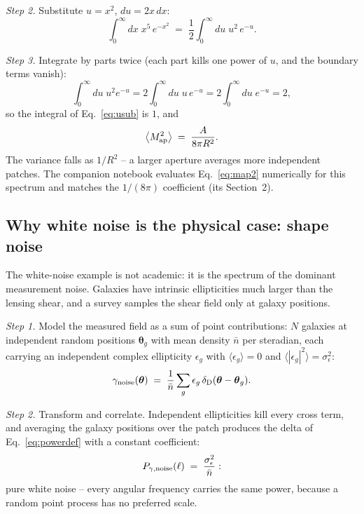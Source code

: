 \documentclass[11pt]{article}
\newcommand{\Map}{M_{\rm ap}}
\newcommand{\btheta}{\boldsymbol{\theta}}
\numberwithin{equation}{section}
\begin{document}
\emph{Step 2.}  Substitute $u = x^2$, $du = 2x\,dx$:
\begin{equation}
  \int_0^\infty dx\; x^5\, e^{-x^2}
  \;=\; \frac{1}{2}\int_0^\infty du\; u^2\, e^{-u} .
  \label{eq:usub}
\end{equation}

\emph{Step 3.}  Integrate by parts twice (each part kills one power
of $u$, and the boundary terms vanish):
\begin{equation}
  \int_0^\infty du\; u^2 e^{-u}
  = 2\int_0^\infty du\; u\, e^{-u}
  = 2\int_0^\infty du\; e^{-u}
  = 2 ,
  \label{eq:byparts}
\end{equation}
so the integral of Eq.~\eqref{eq:usub} is $1$, and
\begin{equation}
  \bigl\langle \Map^2 \bigr\rangle
  \;=\; \frac{A}{8\pi R^2} .
  \label{eq:map2white}
\end{equation}
The variance falls as $1/R^2$ -- a larger aperture averages more
independent patches.  The companion notebook evaluates
Eq.~\eqref{eq:map2} numerically for this spectrum and matches the
$1/(8\pi)$ coefficient (its Section~2).

\subsection{Why white noise is the physical case: shape noise}
\label{sec:shapenoise}

The white-noise example is not academic: it is the spectrum of the
dominant measurement noise.  Galaxies have intrinsic ellipticities
much larger than the lensing shear, and a survey samples the shear
field only at galaxy positions.

\emph{Step 1.}  Model the measured field as a sum of point
contributions: $N$ galaxies at independent random positions
$\btheta_g$ with mean density $\bar n$ per steradian, each carrying
an independent complex ellipticity $\epsilon_g$ with
$\langle\epsilon_g\rangle = 0$ and
$\langle|\epsilon_g|^2\rangle = \sigma_\epsilon^2$:
\begin{equation}
  \gamma_{\rm noise}(\btheta)
  \;=\; \frac{1}{\bar n}\sum_g \epsilon_g\,
  \delta_{\rm D}(\btheta - \btheta_g) .
  \label{eq:noisefield}
\end{equation}

\emph{Step 2.}  Transform and correlate.  Independent ellipticities
kill every cross term, and averaging the galaxy positions over the
patch produces the delta of Eq.~\eqref{eq:powerdef} with a constant
coefficient:
\begin{equation}
  P_{\gamma,\rm noise}(\ell)
  \;=\; \frac{\sigma_\epsilon^2}{\bar n} :
  \label{eq:noisepower}
\end{equation}
pure white noise -- every angular frequency carries the same power,
because a random point process has no preferred scale.
\end{document}
